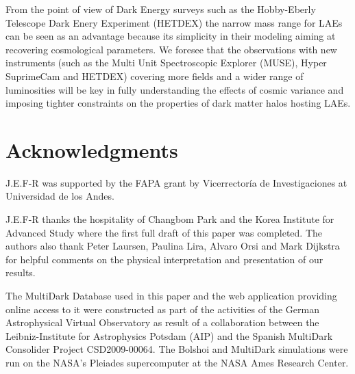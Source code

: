 \documentclass{emulateapj}
\begin{document}
From the point of view of Dark Energy surveys such as the Hobby-Eberly
Telescope Dark Enery Experiment (HETDEX) the narrow mass range for
LAEs can be seen as an advantage because its simplicity in their
modeling aiming at recovering cosmological parameters. We foresee that
the observations with new instruments (such as the Multi Unit
Spectroscopic Explorer (MUSE), Hyper SuprimeCam and HETDEX) covering
more fields and a wider range of luminosities will be key in fully
understanding the effects of cosmic variance  and imposing tighter
constraints on the properties of dark matter halos hosting LAEs. 



\section*{Acknowledgments} 

J.E.F-R was supported by the FAPA grant by Vicerrector\'ia de
Investigaciones at Universidad de los Andes.  

J.E.F-R thanks the hospitality of Changbom Park and the Korea
Institute for Advanced Study where the first full draft of this paper
was completed. The authors also thank Peter Laursen, Paulina Lira, 
Alvaro Orsi and Mark Dijkstra for helpful comments on the physical
interpretation and presentation of our results. 


The MultiDark Database used in this paper and the web application
providing online access to it were constructed as part of the
activities of the German Astrophysical Virtual Observatory as result
of a collaboration between the Leibniz-Institute for Astrophysics
Potsdam (AIP) and the Spanish MultiDark Consolider Project
CSD2009-00064. The Bolshoi and MultiDark simulations were run on the
NASA's Pleiades supercomputer at the NASA Ames Research Center. 





\end{document}
